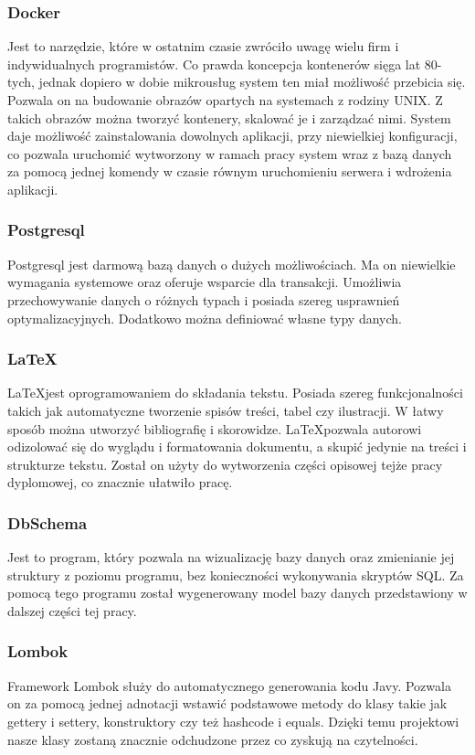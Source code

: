 \subsubsection{Docker}
Jest to narzędzie, które w ostatnim czasie zwróciło uwagę wielu firm i indywidualnych programistów. Co prawda koncepcja kontenerów sięga lat 80-tych, jednak dopiero w dobie mikrousług system ten miał możliwość przebicia się. Pozwala on na budowanie obrazów opartych na systemach z rodziny UNIX. Z takich obrazów można tworzyć kontenery, skalować je i zarządzać nimi. System daje możliwość zainstalowania dowolnych aplikacji, przy niewielkiej konfiguracji, co pozwala uruchomić wytworzony w ramach pracy system wraz z bazą danych za pomocą jednej komendy w czasie równym uruchomieniu serwera i wdrożenia aplikacji.

\subsubsection{Postgresql}
Postgresql jest darmową bazą danych o dużych możliwościach. Ma on niewielkie wymagania systemowe oraz oferuje wsparcie dla transakcji. Umożliwia przechowywanie danych o różnych typach i posiada szereg usprawnień optymalizacyjnych. Dodatkowo można definiować własne typy danych.

\subsubsection{\LaTeX}
\LaTeX jest oprogramowaniem do składania tekstu. Posiada szereg funkcjonalności takich jak automatyczne tworzenie spisów treści, tabel czy ilustracji. W łatwy sposób można utworzyć bibliografię i skorowidze. \LaTeX pozwala autorowi odizolować się do wyglądu i formatowania dokumentu, a skupić jedynie na treści i strukturze tekstu. Został on użyty do wytworzenia części opisowej tejże pracy dyplomowej, co znacznie ułatwiło pracę.

\subsubsection{DbSchema}
Jest to program, który pozwala na wizualizację bazy danych oraz zmienianie jej struktury z poziomu programu, bez konieczności wykonywania skryptów SQL. Za pomocą tego programu został wygenerowany model bazy danych przedstawiony w dalszej części tej pracy.

\subsubsection{Lombok}
Framework Lombok służy do automatycznego generowania kodu Javy. Pozwala on za pomocą jednej adnotacji wstawić podstawowe metody do klasy takie jak gettery i settery, konstruktory czy też hashcode i equals. Dzięki temu projektowi nasze klasy zostaną znacznie odchudzone przez co zyskują na czytelności.
